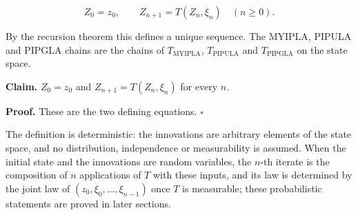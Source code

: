 \documentclass[11pt,a4paper]{report}
\begin{document}
\[Z_0=z_0,\qquad Z_{n+1}=T(Z_n,\xi_n)\quad(n\ge0).\]


By the recursion theorem this defines a unique sequence. The MYIPLA, PIPULA and PIPGLA chains are the chains of \(T_{\mathrm{MYIPLA}}\), \(T_{\mathrm{PIPULA}}\) and \(T_{\mathrm{PIPGLA}}\) on the state space.




\textbf{Claim.} \(Z_0=z_0\) and \(Z_{n+1}=T(Z_n,\xi_n)\) for every \(n\).




\textbf{Proof.} These are the two defining equations. \(\square\)




The definition is deterministic: the innovations are arbitrary elements of the state space, and no distribution, independence or measurability is assumed. When the initial state and the innovations are random variables, the \(n\)-th iterate is the composition of \(n\) applications of \(T\) with these inputs, and its law is determined by the joint law of \((z_0,\xi_0,\dots,\xi_{n-1})\) once \(T\) is measurable; these probabilistic statements are proved in later sections.
\end{document}
